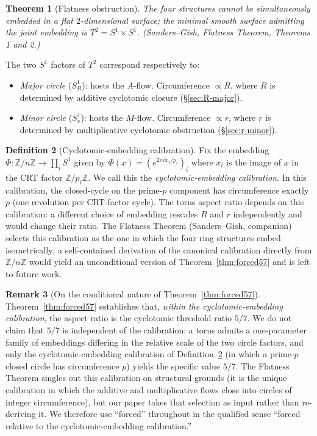 \documentclass[11pt,reqno]{amsart}
\theoremstyle{plain}
\newtheorem{theorem}{Theorem}
\theoremstyle{definition}
\newtheorem{definition}[theorem]{Definition}
\newtheorem{remark}[theorem]{Remark}
\newcommand{\Z}{\mathbb{Z}}
\begin{document}
\begin{theorem}[Flatness obstruction]\label{thm:flatness-cite}
The four structures cannot be simultaneously embedded in a flat $2$-dimensional surface; the minimal smooth surface admitting the joint embedding is $T^2 = S^1 \times S^1$. \emph{(Sanders--Gish, Flatness Theorem, Theorems 1 and 2.)}
\end{theorem}

The two $S^1$ factors of $T^2$ correspond respectively to:
\begin{itemize}
\item \emph{Major circle} ($S^1_R$): hosts the $A$-flow. Circumference $\propto R$, where $R$ is determined by additive cyclotomic closure (\S\ref{sec:R-major}).
\item \emph{Minor circle} ($S^1_r$): hosts the $M$-flow. Circumference $\propto r$, where $r$ is determined by multiplicative cyclotomic obstruction (\S\ref{sec:r-minor}).
\end{itemize}

\begin{definition}[Cyclotomic-embedding calibration] \label{def:cyclo-cal}
Fix the embedding $\Phi \colon \Z/n\Z \to \prod_{i} S^{1}$ given by $\Phi(x) = (e^{2\pi i x_{i} / p_{i}})_{i}$ where $x_{i}$ is the image of $x$ in the CRT factor $\Z/p_{i}\Z$. We call this the \emph{cyclotomic-embedding calibration}. In this calibration, the closed-cycle on the prime-$p$ component has circumference exactly $p$ (one revolution per CRT-factor cycle). The torus aspect ratio depends on this calibration: a different choice of embedding rescales $R$ and $r$ independently and would change their ratio. The Flatness Theorem (Sanders--Gish, companion) selects this calibration as the one in which the four ring structures embed isometrically; a self-contained derivation of the canonical calibration directly from $\Z/n\Z$ would yield an unconditional version of Theorem~\ref{thm:forced57} and is left to future work.
\end{definition}

\begin{remark}[On the conditional nature of Theorem~\ref{thm:forced57}] \label{rem:calibration}
Theorem~\ref{thm:forced57} establishes that, \emph{within the cyclotomic-embedding calibration}, the aspect ratio is the cyclotomic threshold ratio $5/7$. We do not claim that $5/7$ is independent of the calibration: a torus admits a one-parameter family of embeddings differing in the relative scale of the two circle factors, and only the cyclotomic-embedding calibration of Definition~\ref{def:cyclo-cal} (in which a prime-$p$ closed circle has circumference $p$) yields the specific value $5/7$. The Flatness Theorem singles out this calibration on structural grounds (it is the unique calibration in which the additive and multiplicative flows close into circles of integer circumference), but our paper takes that selection as input rather than re-deriving it. We therefore use ``forced'' throughout in the qualified sense ``forced relative to the cyclotomic-embedding calibration.''
\end{remark}
\end{document}
